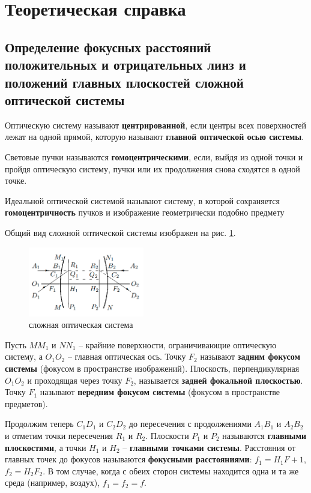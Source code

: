 


	
	
	\section*{Теоретическая справка}
	\subsection*{Определение фокусных расстояний положительных и отрицательных линз и положений главных плоскостей сложной оптической системы}
	
	Оптическую систему называют \textbf{центрированной}, если центры всех поверхностей лежат на одной прямой, которую называют \textbf{главной оптической осью системы}. 
	
	Световые пучки называются \textbf{гомоцентрическими}, если, выйдя из одной точки и пройдя оптическую систему, пучки или их продолжения снова сходятся в одной точке.
	
	Идеальной оптической системой называют систему, в которой сохраняется \textbf{гомоцентричность} пучков и изображение геометрически подобно
	предмету
	
	Общий вид сложной оптической системы изображен на рис. \ref{fig:optical_system}.
	
	\begin{figure}
		\includegraphics[width = 0.45\textwidth]{images/optical_system.png}
		\caption{сложная оптическая система}
		\label{fig:optical_system}
	\end{figure}

	Пусть $MM_1$ и $NN_1$ -- крайние поверхности, ограничивающие оптическую систему, а $O_1O_2$ -- главная оптическая ось. Точку $F_2$ называют \textbf{задним фокусом системы} (фокусом в пространстве изображений). Плоскость, перпендикулярная $O_1O_2$ и проходящая
	через точку $F_2$, называется \textbf{задней фокальной плоскостью}. Точку $F_1$ называют \textbf{передним фокусом системы} (фокусом в пространстве предметов). 
	
	Продолжим теперь $C_1D_1$ и $C_2D_2$ до пересечения с продолжениями $A_1B_1$ и $A_2B_2$ и отметим точки пересечения $R_1$ и $R_2$. Плоскости $P_1$ и $P_2$ называются \textbf{главными плоскостями}, а точки $H_1$ и $H_2$ -- \textbf{главными точками системы}. Расстояния от главных точек до фокусов называются \textbf{фокусными расстояниями}: $f_1 = H_1F+1$, $f_2 = H_2F_2$. В том случае, когда с обеих сторон системы находится одна и та же среда (например, воздух), $f_1 = f_2 = f$.
	
